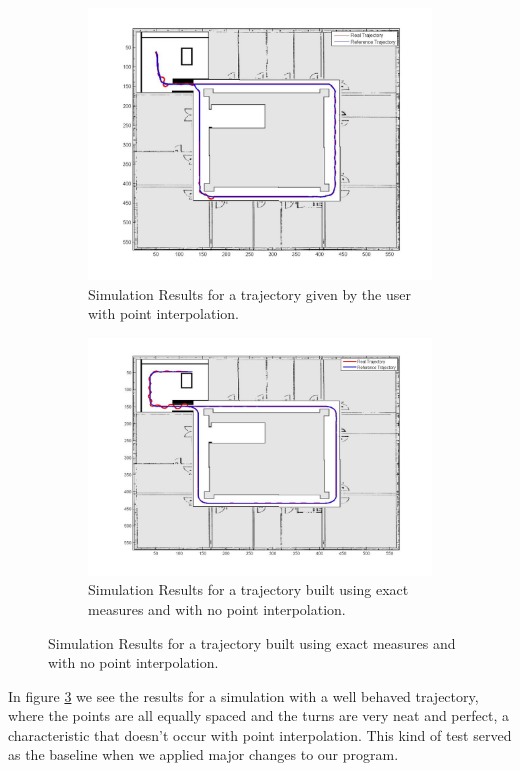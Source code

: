 \documentclass[11pt,a4paper]{scrartcl}
\begin{document}
	\begin{figure}[H]
      \centering
      \begin{subfigure}{.5\textwidth}
          \centering
          \includegraphics[width=0.7\linewidth]{simulation_map.jpg}
          \caption{Simulation Results for a trajectory given by the user with point interpolation.}
          \label{fig:Simulation_Map}
      \end{subfigure}%
      \begin{subfigure}{.5\textwidth}
          \centering
          \includegraphics[width=0.7\linewidth]{simulation_map_fixed.jpg}
          \caption{Simulation Results for a trajectory built using exact measures and with no point interpolation.}
          \label{fig:Simulation_Map_Fixed}
      \end{subfigure}
	\end{figure}

In figure \ref{fig:Simulation_Map_Fixed} we see the results for a simulation with a well behaved trajectory, where the points are all equally spaced and the turns are very neat and perfect, a characteristic that doesn't occur with point interpolation. This kind of test served as the baseline when we applied major changes to our program.
\end{document}
